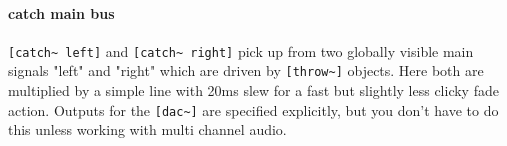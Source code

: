 \paragraph{catch main bus}
\verb+[catch~ left]+ and \verb+[catch~ right]+ pick up from 
two globally visible main signals "left" and "right" which
are driven by \verb+[throw~]+ objects. Here both are
multiplied by a simple line with 20ms slew for a fast but slightly
less clicky fade action. Outputs for the \verb+[dac~]+ are specified
explicitly, but you don't have to do this unless working with multi channel audio.